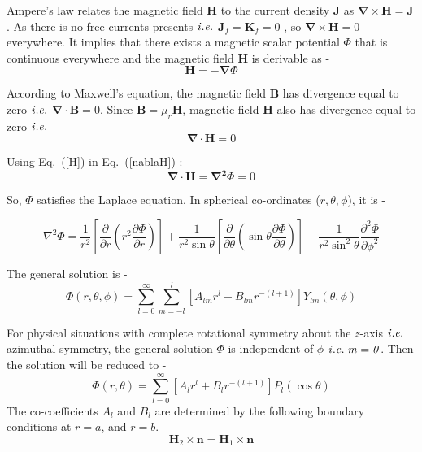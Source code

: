 
Ampere's law relates the magnetic field $\bm{H}$ to the current density $\bm{J}$ as \(\bm{\nabla}\times\bm{H}=\bm{J}\). As there is no free currents presents $\it{i.e.}$ \(\bm{J}_f=\bm{K}_f=0\) , so \(\bm{\nabla}\times\bm{H}=0\) everywhere. It implies that there exists a magnetic scalar potential \(\Phi\) that is continuous  everywhere and the  magnetic field $\bm{H}$ is derivable as -
\begin{equation}\label{H}
\bm{H}=-\bm{\nabla}\Phi
\end{equation} 

According to Maxwell's equation, the magnetic field $\bm{B}$ has divergence equal to zero $\it{i.e.}$ \(\bm{\nabla}\cdot\bm{B}=0\). Since \(\bm{B}=\mu_r\bm{H}\), magnetic field $\bm{H}$ also has divergence equal to zero $\it{i.e.}$
\begin{equation}\label{nablaH}
\bm{\nabla}\cdot\bm{H}=0
\end{equation}

Using Eq.~(\ref{H}) in Eq.~(\ref{nablaH}) :
\begin{equation}
\bm{\nabla}\cdot\bm{H}=\bm{\nabla^2}\Phi=0
\end{equation}


So, $\Phi$ satisfies the Laplace equation.  In spherical co-ordinates ($r, \theta, \phi$), it is -

\begin{equation}
\nabla^2 \Phi=\frac{1}{r^2}\left[\frac{\partial }{\partial r} \left(r^2\frac{\partial \Phi}{\partial r}\right) \right]+ \frac{1}{r^2 \sin\theta}\left[\frac{\partial }{\partial \theta} \left(\sin\theta\frac{\partial \Phi}{\partial \theta}\right) \right]+ \frac{1}{r^2 \sin^2\theta}\frac{\partial^2 \Phi}{\partial \phi^2}
\end{equation}

The general solution is -
\begin{equation}
\Phi(r,\theta, \phi)=\sum_{l=0}^{\infty}\sum_{m=-l}^l [A_{lm}r^l+B_{lm}r^{-(l+1)}]Y_{lm}(\theta, \phi)
\end{equation}

For physical situations with complete rotational symmetry about the $z$-axis $\it{i.e.}$ azimuthal symmetry, the general solution $\Phi$ is independent of $\phi$ $\it{i.e.}\;m=0$. Then the solution will be reduced to -
\begin{equation}
\Phi(r,\theta)=\sum_{l=0}^{\infty} [A_lr^l+B_lr^{-(l+1)}]P_l(\cos\theta)
\end{equation}
The co-coefficients $A_l$ and $B_l$ are determined by the following boundary conditions at $r=a$, and $r=b$.
\begin{equation}\label{b1}   
\bm{H}_2\times \bm{n} = \bm{H}_1\times \bm{n}  
\end{equation}

